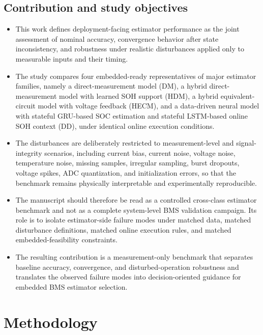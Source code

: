 \documentclass[review]{elsarticle}
\begin{document}
\subsection{Contribution and study objectives}
\begin{itemize}[leftmargin=*]
    \item This work defines deployment-facing estimator performance as the joint assessment of nominal accuracy, convergence behavior after state inconsistency, and robustness under realistic disturbances applied only to measurable inputs and their timing.
    \item The study compares four embedded-ready representatives of major estimator families, namely a direct-measurement model (DM), a hybrid direct-measurement model with learned SOH support (HDM), a hybrid equivalent-circuit model with voltage feedback (HECM), and a data-driven neural model with stateful GRU-based SOC estimation and stateful LSTM-based online SOH context (DD), under identical online execution conditions.
    \item The disturbances are deliberately restricted to measurement-level and signal-integrity scenarios, including current bias, current noise, voltage noise, temperature noise, missing samples, irregular sampling, burst dropouts, voltage spikes, ADC quantization, and initialization errors, so that the benchmark remains physically interpretable and experimentally reproducible.
    \item The manuscript should therefore be read as a controlled cross-class estimator benchmark and not as a complete system-level BMS validation campaign. Its role is to isolate estimator-side failure modes under matched data, matched disturbance definitions, matched online execution rules, and matched embedded-feasibility constraints.
    \item The resulting contribution is a measurement-only benchmark that separates baseline accuracy, convergence, and disturbed-operation robustness and translates the observed failure modes into decision-oriented guidance for embedded BMS estimator selection.
\end{itemize}

\section{Methodology}
\end{document}
